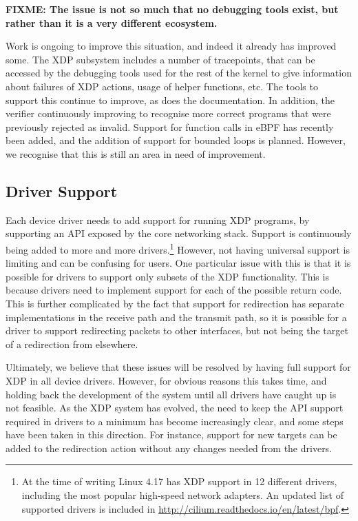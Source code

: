 \documentclass[10pt,sigconf]{acmart}
\begin{document}
\textbf{FIXME: The issue is not so much that no debugging tools exist, but
  rather than it is a very different ecosystem.}

Work is ongoing to improve this situation, and indeed it already has improved
some. The XDP subsystem includes a number of tracepoints, that can be accessed
by the debugging tools used for the rest of the kernel to give information about
failures of XDP actions, usage of helper functions, etc. The tools to support
this continue to improve, as does the documentation. In addition, the verifier
continuously improving to recognise more correct programs that were previously
rejected as invalid. Support for function calls in eBPF has recently been added,
and the addition of support for bounded loops is planned. However, we recognise
that this is still an area in need of improvement.

\subsection{Driver Support}
\label{sec:driver-support}
Each device driver needs to add support for running XDP programs, by supporting
an API exposed by the core networking stack. Support is continuously being added
to more and more drivers.\footnote{At the time of writing Linux 4.17 has XDP
  support in 12 different drivers, including the most popular high-speed network
  adapters. An updated list of supported drivers is included in
  \url{http://cilium.readthedocs.io/en/latest/bpf}.} However, not having
universal support is limiting and can be confusing for users. One particular
issue with this is that it is possible for drivers to support only subsets of
the XDP functionality. This is because drivers need to implement support for
each of the possible return code. This is further complicated by the fact that
support for redirection has separate implementations in the receive path and the
transmit path, so it is possible for a driver to support redirecting packets to
other interfaces, but not being the target of a redirection from elsewhere.

Ultimately, we believe that these issues will be resolved by having full support
for XDP in all device drivers. However, for obvious reasons this takes time, and
holding back the development of the system until all drivers have caught up is
not feasible. As the XDP system has evolved, the need to keep the API support
required in drivers to a minimum has become increasingly clear, and some steps
have been taken in this direction. For instance, support for new targets can be
added to the redirection action without any changes needed from the drivers.
\end{document}
